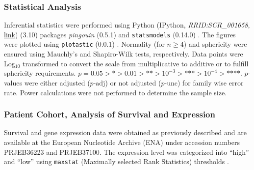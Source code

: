 \subsubsection*{Statistical Analysis}
Inferential statistics were performed using Python (IPython,
\textit{RRID:SCR\_001658},
\href{https://www.ncbi.nlm.nih.gov/sra?term=SCR_001658}{link}) (3.10) packages
\textit{pingouin} (0.5.1) and \texttt{statsmodels} (0.14.0)
\cite{vallatPingouinStatisticsPython2018,seaboldStatsmodelsEconometricStatistical2010}.
The figures were plotted using \texttt{plotastic} (0.0.1)
\cite{kuricPlotasticBridgingPlotting2024}. Normality (for \( n \geq 4 \)) and
sphericity were ensured using Mauchly’s and Shapiro-Wilk tests, respectively.
Data points were Log\(_{10}\) transformed to convert the scale from
multiplicative to additive or to fulfill sphericity requirements. \( p = 0.05 >
\text{*} > 0.01 > \text{**} > 10^{-3} > \text{***}> 10^{-4} > \text{****} \).
$p$-values were either adjusted (\( p{\text{-adj}} \)) or not adjusted (\(
p{\text{-unc}} \)) for family wise error rate. Power calculations were not
performed to determine the sample size.



\subsubsection*{Patient Cohort, Analysis of Survival and Expression}
Survival and gene expression data were obtained as previously described
\cite{seckingerTargetExpressionGeneration2017b,seckingerCD38ImmunotherapeuticTarget2018}
and are available at the European Nucleotide Archive (ENA) under accession
numbers PRJEB36223 and PRJEB37100. The expression level was categorized into
``high'' and ``low'' using \texttt{maxstat} (Maximally selected Rank Statistics)
thresholds \cite{hothornMaximallySelectedRank}.

